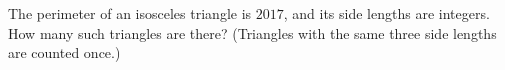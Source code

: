 The perimeter of an isosceles triangle is $2017$, and its side lengths are integers. How many such triangles are there? (Triangles with the same three side lengths are counted once.)
